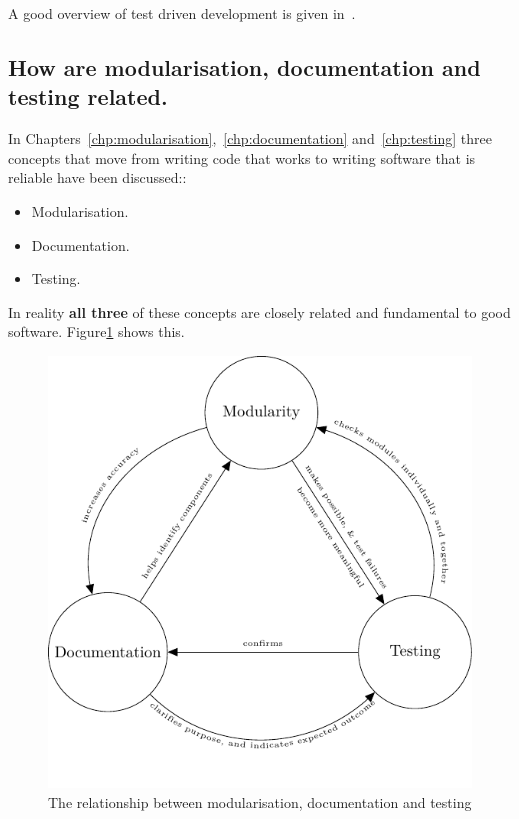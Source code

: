 A good overview of test driven development is given in~\cite{percival2014test}.


\subsection{How are modularisation, documentation and testing related.}
\label{\detokenize{building-tools/07-testing/why/main:how-are-modularisation-documentation-and-testing-related}}

In Chapters~\ref{chp:modularisation},~\ref{chp:documentation}
and~\ref{chp:testing}
three concepts that move from writing code that works to writing software
that is reliable have been discussed::
\begin{itemize}
\item 

Modularisation.

\item 

Documentation.

\item 

Testing.

\end{itemize}


In reality \textbf{all three} of these concepts are closely related and fundamental to
good software. Figure\ref{fig:best_practice_triangle} shows this.

\begin{figure}[!htbp]
\centering

\includegraphics[width=0.750\linewidth]{./assets/best_practice_triangle/main.pdf}
\caption{The relationship between modularisation, documentation and testing}
\label{fig:best_practice_triangle}
\end{figure}
